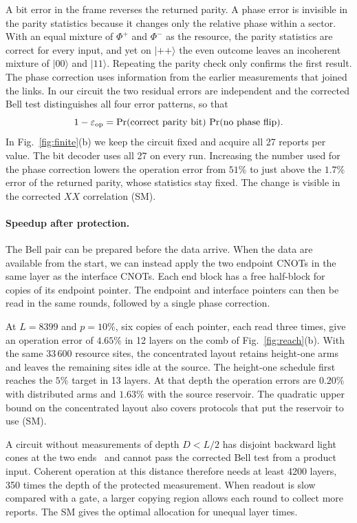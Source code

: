 \documentclass[aps,prl,twocolumn,superscriptaddress,longbibliography,reprint,floatfix]{revtex4-2}
\newcommand{\ket}[1]{\lvert #1\rangle}
\newcommand{\eps}{\varepsilon}
\begin{document}
A bit error in the frame reverses the returned parity. A phase error is invisible in the parity statistics because it changes only the relative phase within a sector. With an equal mixture of $\Phi^+$ and $\Phi^-$ as the resource, the parity statistics are correct for every input, and yet on $\ket{++}$ the even outcome leaves an incoherent mixture of $\ket{00}$ and $\ket{11}$. Repeating the parity check only confirms the first result. The phase correction uses information from the earlier measurements that joined the links. In our circuit the two residual errors are independent and the corrected Bell test distinguishes all four error patterns, so that
\begin{equation}
 1-\eps_{\rm op}=\Pr(\text{correct parity bit})\,\Pr(\text{no phase flip}).
 \label{eq:parity-phase-main}
\end{equation}
In Fig.~\ref{fig:finite}(b) we keep the circuit fixed and acquire all 27 reports per value. The bit decoder uses all 27 on every run. Increasing the number used for the phase correction lowers the operation error from $51\%$ to just above the $1.7\%$ error of the returned parity, whose statistics stay fixed. The change is visible in the corrected $XX$ correlation (SM).

\smallskip
\paragraph*{Speedup after protection.}
The Bell pair can be prepared before the data arrive. When the data are available from the start, we can instead apply the two endpoint CNOTs in the same layer as the interface CNOTs. Each end block has a free half-block for copies of its endpoint pointer. The endpoint and interface pointers can then be read in the same rounds, followed by a single phase correction.

At $L=8399$ and $p=10\%$, six copies of each pointer, each read three times, give an operation error of $4.65\%$ in 12 layers on the comb of Fig.~\ref{fig:reach}(b). With the same $33\,600$ resource sites, the concentrated layout retains height-one arms and leaves the remaining sites idle at the source. The height-one schedule first reaches the $5\%$ target in 13 layers. At that depth the operation errors are $0.20\%$ with distributed arms and $1.63\%$ with the source reservoir. The quadratic upper bound on the concentrated layout also covers protocols that put the reservoir to use (SM).

A circuit without measurements of depth $D<L/2$ has disjoint backward light cones at the two ends~\cite{BHV2006,FossFeig2023} and cannot pass the corrected Bell test from a product input. Coherent operation at this distance therefore needs at least 4200 layers, 350 times the depth of the protected measurement. When readout is slow compared with a gate, a larger copying region allows each round to collect more reports. The SM gives the optimal allocation for unequal layer times.
\end{document}
